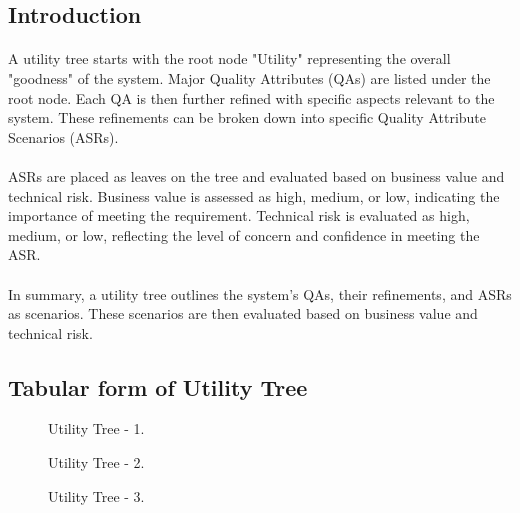 \subsection{Introduction}
\paragraph{} A utility tree starts with the root node "Utility" representing the overall "goodness" of the system. Major Quality Attributes (QAs) are listed under the root node. Each QA is then further refined with specific aspects relevant to the system. These refinements can be broken down into specific Quality Attribute Scenarios (ASRs).
\paragraph{} ASRs are placed as leaves on the tree and evaluated based on business value and technical risk. Business value is assessed as high, medium, or low, indicating the importance of meeting the requirement. Technical risk is evaluated as high, medium, or low, reflecting the level of concern and confidence in meeting the ASR.
\paragraph{} In summary, a utility tree outlines the system's QAs, their refinements, and ASRs as scenarios. These scenarios are then evaluated based on business value and technical risk.
\subsection{Tabular form of Utility Tree}
\begin{figure}[H]
\centering
{}
\caption{\label{Figure::UtilityTree1} Utility Tree - 1.}
\end{figure}
\begin{figure}[H]
\centering
{}
\caption{\label{Figure::UtilityTree2} Utility Tree - 2.}
\end{figure}
\begin{figure}[H]
\centering
{}
\caption{\label{Figure::UtilityTree3} Utility Tree - 3.}
\end{figure}
